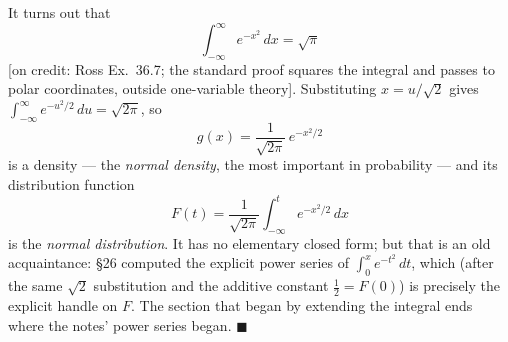 \documentclass[11pt]{report}
\begin{document}
\begin{exbox}
It turns out that
\[
\int_{-\infty}^\infty e^{-x^2}\,dx = \sqrt\pi
\]
[on credit: Ross Ex.\ 36.7; the standard proof squares the integral and passes to polar coordinates, outside one-variable theory]. Substituting $x = u/\sqrt2$ gives $\int_{-\infty}^\infty e^{-u^2/2}\,du = \sqrt{2\pi}$, so
\[
g(x) = \frac{1}{\sqrt{2\pi}}\, e^{-x^2/2}
\]
is a density --- the \emph{normal density}, the most important in probability --- and its distribution function
\[
F(t) = \frac{1}{\sqrt{2\pi}} \int_{-\infty}^t e^{-x^2/2}\,dx
\]
is the \emph{normal distribution}. It has no elementary closed form; but that is an old acquaintance: \S 26 computed the explicit power series of $\int_0^x e^{-t^2}\,dt$, which (after the same $\sqrt2$ substitution and the additive constant $\tfrac12 = F(0)$) is precisely the explicit handle on $F$. The section that began by extending the integral ends where the notes' power series began. \hfill $\blacksquare$
\end{exbox}
\end{document}
